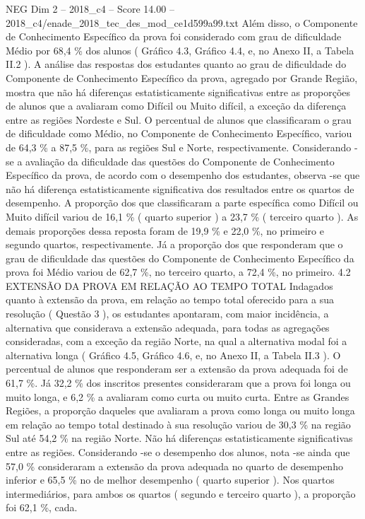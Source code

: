 \begin{textsample}{NEG Dim 2 – 2018\_c4 – Score 14.00 – 2018\_c4/enade\_2018\_tec\_des\_mod\_ce1d599a99.txt}
Além disso, o Componente de Conhecimento Específico da prova foi considerado com grau de dificuldade Médio por 68,4 \% dos alunos ( Gráfico 4.3, Gráfico 4.4, e, no Anexo II, a Tabela II.2 ).
A análise das respostas dos estudantes quanto ao grau de dificuldade do Componente de Conhecimento Específico da prova, agregado por Grande Região, mostra que não há diferenças estatisticamente significativas entre as proporções de alunos que a avaliaram como Difícil ou Muito difícil, a exceção da diferença entre as regiões Nordeste e Sul.
O percentual de alunos que classificaram o grau de dificuldade como Médio, no Componente de Conhecimento Específico, variou de 64,3 \% a 87,5 \%, para as regiões Sul e Norte, respectivamente.
Considerando -se a avaliação da dificuldade das questões do Componente de Conhecimento Específico da prova, de acordo com o desempenho dos estudantes, observa -se que não há diferença estatisticamente significativa dos resultados entre os quartos de desempenho.
A proporção dos que classificaram a parte específica como Difícil ou Muito difícil variou de 16,1 \% ( quarto superior ) a 23,7 \% ( terceiro quarto ).
As demais proporções dessa reposta foram de 19,9 \% e 22,0 \%, no primeiro e segundo quartos, respectivamente.
Já a proporção dos que responderam que o grau de dificuldade das questões do Componente de Conhecimento Específico da prova foi Médio variou de 62,7 \%, no terceiro quarto, a 72,4 \%, no primeiro. 4.2 EXTENSÃO DA PROVA EM RELAÇÃO AO TEMPO TOTAL Indagados quanto à extensão da prova, em relação ao tempo total oferecido para a sua resolução ( Questão 3 ), os estudantes apontaram, com maior incidência, a alternativa que considerava a extensão adequada, para todas as agregações consideradas, com a exceção da região Norte, na qual a alternativa modal foi a alternativa longa ( Gráfico 4.5, Gráfico 4.6, e, no Anexo II, a Tabela II.3 ).
O percentual de alunos que responderam ser a extensão da prova adequada foi de 61,7 \%.
Já 32,2 \% dos inscritos presentes consideraram que a prova foi longa ou muito longa, e 6,2 \% a avaliaram como curta ou muito curta.
Entre as Grandes Regiões, a proporção daqueles que avaliaram a prova como longa ou muito longa em relação ao tempo total destinado à sua resolução variou de 30,3 \% na região Sul até 54,2 \% na região Norte.
Não há diferenças estatisticamente significativas entre as regiões.
Considerando -se o desempenho dos alunos, nota -se ainda que 57,0 \% consideraram a extensão da prova adequada no quarto de desempenho inferior e 65,5 \% no de melhor desempenho ( quarto superior ).
Nos quartos intermediários, para ambos os quartos ( segundo e terceiro quarto ), a proporção foi 62,1 \%, cada.

\end{textsample}
